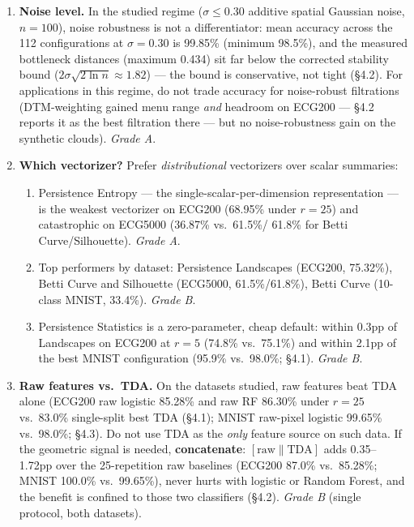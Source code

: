 \documentclass[12pt, a4paper]{report}
\theoremstyle{definition}
\theoremstyle{plain}
\theoremstyle{remark}
\begin{document}
\begin{enumerate}
  \item \textbf{Noise level.} In the studied regime ($\sigma \le 0.30$
    additive spatial Gaussian noise, $n{=}100$), noise robustness is not a
    differentiator: mean accuracy across the 112 configurations at
    $\sigma{=}0.30$ is 99.85\% (minimum 98.5\%), and the measured
    bottleneck distances (maximum
    0.434) sit far below the corrected
    stability bound ($2\sigma\sqrt{2\ln n} \approx 1.82$) --- the bound is
    conservative, not tight (\S4.2). For applications in this
    regime, do not trade accuracy for noise-robust filtrations
    (DTM-weighting gained menu range \emph{and} headroom on ECG200 ---
        \S4.2 reports it as the best filtration there --- but no
        noise-robustness gain on the synthetic clouds).
    \emph{Grade A}.

  \item \textbf{Which vectorizer?} Prefer \emph{distributional} vectorizers
    over scalar summaries:
    \begin{enumerate}
      \item Persistence Entropy --- the single-scalar-per-dimension
        representation --- is the weakest vectorizer on ECG200 (68.95\%
        under $r{=}25$) and catastrophic on ECG5000 (36.87\% vs.\ 61.5\%/
        61.8\% for Betti Curve/Silhouette). \emph{Grade A}.
      \item Top performers by dataset: Persistence Landscapes (ECG200,
        75.32\%), Betti Curve and Silhouette (ECG5000, 61.5\%/61.8\%),
        Betti Curve (10-class MNIST, 33.4\%). \emph{Grade B}.
      \item Persistence Statistics is a zero-parameter, cheap default:
        within 0.3pp of Landscapes on ECG200 at $r{=}5$ (74.8\% vs.\
        75.1\%) and within 2.1pp of the best MNIST configuration (95.9\%
        vs.\ 98.0\%; \S4.1). \emph{Grade B}.
    \end{enumerate}

  \item \textbf{Raw features vs.\ TDA.} On the datasets studied, raw
    features beat TDA alone (ECG200 raw logistic 85.28\% and raw RF
    86.30\% under $r{=}25$ vs.\ 83.0\% single-split best TDA (\S4.1); MNIST raw-pixel logistic 99.65\% vs.\
    98.0\%; \S4.3). Do not use TDA as the \emph{only} feature source on
    such data. If the geometric signal is needed, \textbf{concatenate}:
    $[\text{raw} \| \text{TDA}]$ adds 0.35--1.72pp over the 25-repetition
    raw baselines (ECG200 87.0\% vs.\ 85.28\%; MNIST 100.0\% vs.\ 99.65\%),
    never hurts with logistic or Random Forest, and the benefit is confined
    to those two classifiers (\S4.2). \emph{Grade B} (single protocol,
    both datasets).


\end{enumerate}
\end{document}
